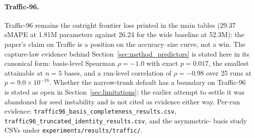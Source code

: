 \paragraph{Traffic-96.} Traffic-96 remains the outright frontier loss
printed in the main tables (29.37 sMAPE at 1.81M parameters against 26.24
for the wide baseline at 52.3M): the paper's claim on Traffic is a position
on the accuracy--size curve, not a win. The capture-law evidence behind
Section~\ref{sec:method_predictors} is stated here in its canonical form:
basis-level Spearman $\rho = -1.0$ with exact $p = 0.017$, the smallest
attainable at $n = 5$ bases, and a run-level correlation of $\rho = -0.98$
over 25 runs at $p = 9.0 \times 10^{-18}$. Whether the narrow-trunk default
has a boundary on Traffic-96 is stated as open in
Section~\ref{sec:limitations}; the earlier attempt to settle it was
abandoned for seed instability and is not cited as evidence either way.
Per-run evidence: \texttt{traffic96\_basis\_completeness\_results.csv},
\texttt{traffic96\_truncated\_identity\_results.csv}, and the asymmetric-
basis study CSVs under \texttt{experiments/results/traffic/}.
